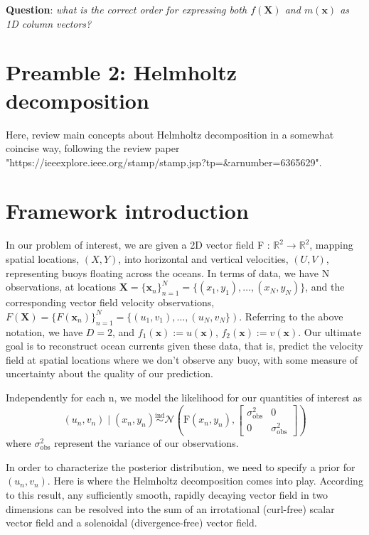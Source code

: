 \documentclass[11pt,a4paper]{article}
\begin{document}
\textbf{Question}: \textit{what is the correct order for expressing both $f(\textbf{X})$ and $m(\textbf{x})$ as 1D column vectors? }

\section*{Preamble 2: Helmholtz decomposition}

Here, review main concepts about Helmholtz decomposition in a somewhat coincise way, following the review paper "https://ieeexplore.ieee.org/stamp/stamp.jsp?tp=\&arnumber=6365629". 


\section*{Framework introduction}

In our problem of interest, we are given a 2D vector field F : $ \mathbb{R}^2 \rightarrow \mathbb{R}^2$, mapping spatial locations, $(X,Y)$, into horizontal and vertical velocities, $(U,V)$, representing buoys floating across the oceans. In terms of data, we have N observations, at locations $\textbf{X} = \{\textbf{x}_n\}_{n=1}^N = \{(x_1, y_1), \ldots, (x_N, y_N)\}$, and the corresponding vector field velocity observations, $F(\textbf{X}) = \{F(\textbf{x}_n)\}_{n=1}^N = \{(u_1, v_1), \ldots, (u_N, v_N\})$. Referring to the above notation, we have $D = 2$, and $f_1(\textbf{x}) := u(\textbf{x})$, $f_2(\textbf{x}) := v(\textbf{x})$. Our ultimate goal is to reconstruct ocean currents given these data, that is, predict the velocity field at spatial locations where we don't observe any buoy, with some measure of uncertainty about the quality of our prediction. 

Independently for each n, we model the likelihood for our quantities of interest as
$$
(u_n, v_n) \mid (x_n, y_n) \stackrel{\text{ind}}{\sim} \mathcal{N}\left(\text{F}(x_n, y_n), \begin{bmatrix}
\sigma^2_{\text{obs}} & 0 \\ 0 & \sigma^2_{\text{obs}}
\end{bmatrix} \right)
$$
where $\sigma^2_{\text{obs}}$ represent the variance of our observations.

In order to characterize the posterior distribution, we need to specify a prior for $(u_n, v_n)$. Here is where the Helmholtz decomposition comes into play. According to this result, any sufficiently smooth, rapidly decaying vector field in two dimensions can be resolved into the sum of an irrotational (curl-free) scalar vector field and a solenoidal (divergence-free) vector field. 
\end{document}
